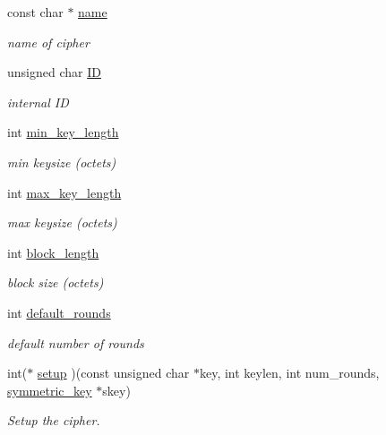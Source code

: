 \begin{DoxyCompactItemize}
\item 
const char $\ast$ \mbox{\hyperlink{structltc__cipher__descriptor_af0cf296468366b502b0584af87168058}{name}}
\begin{DoxyCompactList}\small\item\em name of cipher \end{DoxyCompactList}\item 
unsigned char \mbox{\hyperlink{structltc__cipher__descriptor_a75a932af8e44b27b5952e512a2fe5678}{ID}}
\begin{DoxyCompactList}\small\item\em internal ID \end{DoxyCompactList}\item 
int \mbox{\hyperlink{structltc__cipher__descriptor_abc6acf3a67f3cb3e8af9f94868014c3a}{min\+\_\+key\+\_\+length}}
\begin{DoxyCompactList}\small\item\em min keysize (octets) \end{DoxyCompactList}\item 
int \mbox{\hyperlink{structltc__cipher__descriptor_a16bbbdbee9700eb13054d8edd2821456}{max\+\_\+key\+\_\+length}}
\begin{DoxyCompactList}\small\item\em max keysize (octets) \end{DoxyCompactList}\item 
int \mbox{\hyperlink{structltc__cipher__descriptor_afa2af7325fd3a834910dd92e8c9acf49}{block\+\_\+length}}
\begin{DoxyCompactList}\small\item\em block size (octets) \end{DoxyCompactList}\item 
int \mbox{\hyperlink{structltc__cipher__descriptor_a44ba0f7b336ec082eb9a04cf3e7ff804}{default\+\_\+rounds}}
\begin{DoxyCompactList}\small\item\em default number of rounds \end{DoxyCompactList}\item 
int($\ast$ \mbox{\hyperlink{structltc__cipher__descriptor_a2f6a2e251c83c5d3b6bd62674a82d602}{setup}} )(const unsigned char $\ast$key, int keylen, int num\+\_\+rounds, \mbox{\hyperlink{tomcrypt__cipher_8h_ac5a146550efe94c415d95abc7e454362}{symmetric\+\_\+key}} $\ast$skey)
\begin{DoxyCompactList}\small\item\em Setup the cipher. \end{DoxyCompactList}\item 

\end{DoxyCompactItemize}
